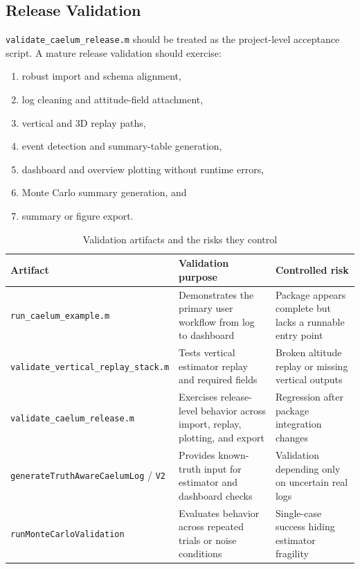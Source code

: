 \documentclass[colorlinks,upint,subscriptcorrection,varvw,hyphenate,balance]{asmeconf}
\newcommand{\code}[1]{\texttt{\allowbreak#1}}
\begin{document}
\subsection{Release Validation}
\code{validate\_caelum\_release.m} should be treated as the project-level acceptance script. A mature release validation should exercise:
\begin{enumerate}[leftmargin=*,nosep]
\item robust import and schema alignment,
\item log cleaning and attitude-field attachment,
\item vertical and 3D replay paths,
\item event detection and summary-table generation,
\item dashboard and overview plotting without runtime errors,
\item Monte Carlo summary generation, and
\item summary or figure export.
\end{enumerate}

\begin{table}[t]
\caption{Validation artifacts and the risks they control}
\centering
\begin{tabularx}{\textwidth}{l Y Y}
\toprule
Artifact & Validation purpose & Controlled risk \\
\midrule
\code{run\_caelum\_example.m} & Demonstrates the primary user workflow from log to dashboard & Package appears complete but lacks a runnable entry point \\
\code{validate\_vertical\_replay\_stack.m} & Tests vertical estimator replay and required fields & Broken altitude replay or missing vertical outputs \\
\code{validate\_caelum\_release.m} & Exercises release-level behavior across import, replay, plotting, and export & Regression after package integration changes \\
\code{generateTruthAwareCaelumLog} / \code{V2} & Provides known-truth input for estimator and dashboard checks & Validation depending only on uncertain real logs \\
\code{runMonteCarloValidation} & Evaluates behavior across repeated trials or noise conditions & Single-case success hiding estimator fragility \\
\bottomrule
\end{tabularx}
\label{tab:validation}
\end{table}

\end{document}
